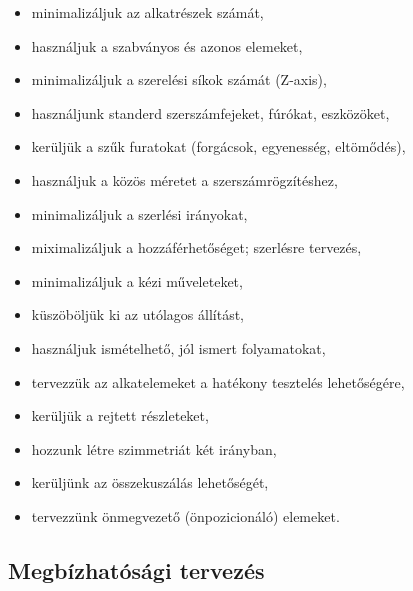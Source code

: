 \documentclass[11pt]{article}
\begin{document}
				\begin{itemize}
					\item minimalizáljuk az alkatrészek számát,
					\item használjuk a szabványos és azonos elemeket, 
					\item minimalizáljuk a szerelési síkok számát (Z-axis), 
					\item használjunk standerd szerszámfejeket, fúrókat, eszközöket,
					\item kerüljük a szűk furatokat (forgácsok, egyenesség, eltömődés), 
					\item használjuk a közös méretet a szerszámrögzítéshez,
					\item minimalizáljuk a szerlési irányokat,
					\item miximalizáljuk a hozzáférhetőséget; szerlésre tervezés,
					\item minimalizáljuk a kézi műveleteket,
					\item küszöböljük ki az utólagos állítást,
					\item használjuk ismételhető, jól ismert folyamatokat, 
					\item tervezzük az alkatelemeket a hatékony tesztelés lehetőségére,
					\item kerüljük a rejtett részleteket,
					\item hozzunk létre szimmetriát két irányban, 
					\item kerüljünk az összekuszálás lehetőségét, 
					\item tervezzünk önmegvezető (önpozicionáló) elemeket.
				\end{itemize}

		\subsection{Megbízhatósági tervezés}
\end{document}
